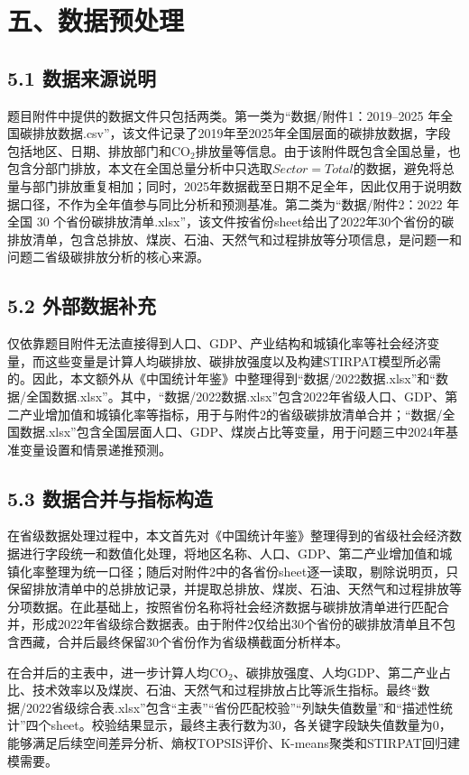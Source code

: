 \documentclass[UTF8,zihao=-4,fontset=windows]{ctexart}
\begin{document}
\section*{五、数据预处理}

\subsection*{5.1 数据来源说明}

题目附件中提供的数据文件只包括两类。第一类为“数据/附件1：2019--2025 年全国碳排放数据.csv”，该文件记录了2019年至2025年全国层面的碳排放数据，字段包括地区、日期、排放部门和CO$_2$排放量等信息。由于该附件既包含全国总量，也包含分部门排放，本文在全国总量分析中只选取$Sector=Total$的数据，避免将总量与部门排放重复相加；同时，2025年数据截至日期不足全年，因此仅用于说明数据口径，不作为全年值参与同比分析和预测基准。第二类为“数据/附件2：2022 年全国 30 个省份碳排放清单.xlsx”，该文件按省份sheet给出了2022年30个省份的碳排放清单，包含总排放、煤炭、石油、天然气和过程排放等分项信息，是问题一和问题二省级碳排放分析的核心来源。

\subsection*{5.2 外部数据补充}

仅依靠题目附件无法直接得到人口、GDP、产业结构和城镇化率等社会经济变量，而这些变量是计算人均碳排放、碳排放强度以及构建STIRPAT模型所必需的。因此，本文额外从《中国统计年鉴》中整理得到“数据/2022数据.xlsx”和“数据/全国数据.xlsx”。其中，“数据/2022数据.xlsx”包含2022年省级人口、GDP、第二产业增加值和城镇化率等指标，用于与附件2的省级碳排放清单合并；“数据/全国数据.xlsx”包含全国层面人口、GDP、煤炭占比等变量，用于问题三中2024年基准变量设置和情景递推预测。

\subsection*{5.3 数据合并与指标构造}

在省级数据处理过程中，本文首先对《中国统计年鉴》整理得到的省级社会经济数据进行字段统一和数值化处理，将地区名称、人口、GDP、第二产业增加值和城镇化率整理为统一口径；随后对附件2中的各省份sheet逐一读取，剔除说明页，只保留排放清单中的总排放记录，并提取总排放、煤炭、石油、天然气和过程排放等分项数据。在此基础上，按照省份名称将社会经济数据与碳排放清单进行匹配合并，形成2022年省级综合数据表。由于附件2仅给出30个省份的碳排放清单且不包含西藏，合并后最终保留30个省份作为省级横截面分析样本。

在合并后的主表中，进一步计算人均CO$_2$、碳排放强度、人均GDP、第二产业占比、技术效率以及煤炭、石油、天然气和过程排放占比等派生指标。最终“数据/2022省级综合表.xlsx”包含“主表”“省份匹配校验”“列缺失值数量”和“描述性统计”四个sheet。校验结果显示，最终主表行数为30，各关键字段缺失值数量为0，能够满足后续空间差异分析、熵权TOPSIS评价、K-means聚类和STIRPAT回归建模需要。
\end{document}

